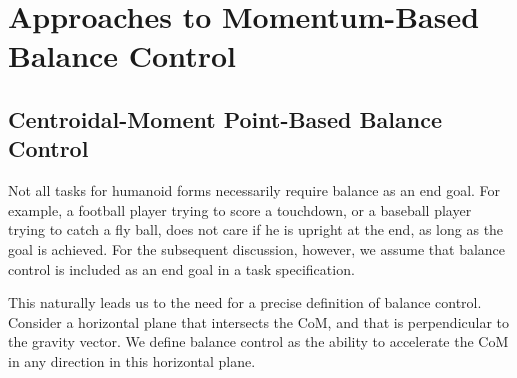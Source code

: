 \documentclass{llncs}
\begin{document}




\section{Approaches to Momentum-Based Balance Control}
\label{sec:approaches}






\subsection{Centroidal-Moment Point-Based Balance Control }

Not all tasks for humanoid forms necessarily require balance as an end goal. 
For example, a football player trying to score a touchdown, or a baseball player trying to catch a fly ball,
does not care if he is upright at the end, as long as the goal is achieved.
For the subsequent discussion, however, we assume that balance control is included as an end goal in a task specification.

This naturally leads us to the need for a precise definition of balance control.
Consider a horizontal plane that intersects the CoM, and that is perpendicular to the gravity vector.
We define balance control as the ability to accelerate the CoM in any direction in this 
horizontal plane.
\end{document}
